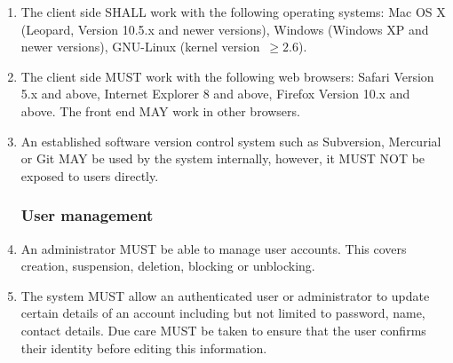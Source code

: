 \begin{enumerate}[1]
\item The client side SHALL work with the following operating systems: Mac OS X (Leopard, Version 10.5.x and newer versions), Windows (Windows XP and newer versions), GNU-Linux (kernel version~$\ge 2.6$).

\item The client side MUST work with the following web browsers: Safari Version 5.x and above, Internet Explorer 8 and above, Firefox Version 10.x and above. The front end MAY work in other browsers.

\item An established software version control system such as Subversion, Mercurial or Git MAY be used by the system internally, however, it MUST NOT be exposed to users directly.

\subsubsection{User management}
\item An administrator MUST be able to manage user accounts. This covers creation, suspension, deletion, blocking or unblocking.

\item The system MUST allow an authenticated user or administrator to update certain details of an account including but not limited to password, name, contact details. Due care MUST be taken to ensure that the user confirms their identity before editing this information.
\end{enumerate}

